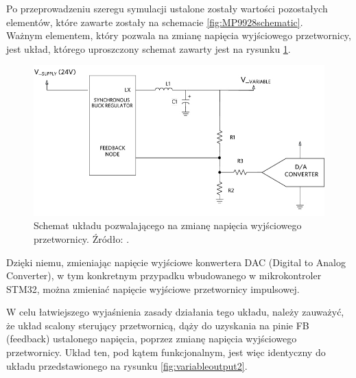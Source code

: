 Po przeprowadzeniu szeregu symulacji ustalone zostały wartości pozostałych elementów, które zawarte zostały na schemacie \ref{fig:MP9928schematic}. \\

Ważnym elementem, który pozwala na zmianę napięcia wyjściowego przetwornicy, jest układ, którego uproszczony schemat zawarty jest na rysunku \ref{fig:zmiananapieciaschemat}.

\begin{figure}[h!]
    \begin{center}
        \includegraphics[width = 15cm]{images/variableoutput1_2.jpg}
        \caption{Schemat układu pozwalającego na zmianę napięcia wyjściowego przetwornicy. Źródło: \cite{variableoutput}.}
        \label{fig:zmiananapieciaschemat}
    \end{center}
\end{figure}

Dzięki niemu, zmieniając napięcie wyjściowe konwertera DAC (Digital to Analog Converter), w tym konkretnym przypadku wbudowanego w mikrokontroler STM32, można zmieniać napięcie wyjściowe przetwornicy impulsowej.

W celu łatwiejszego wyjaśnienia zasady działania tego układu, należy zauważyć, że układ scalony sterujący przetwornicą, dąży do
uzyskania na pinie FB (feedback) ustalonego napięcia, poprzez zmianę napięcia wyjściowego przetwornicy.
Układ ten, pod kątem funkcjonalnym, jest więc identyczny do układu przedstawionego na rysunku \ref{fig:variableoutput2}.

